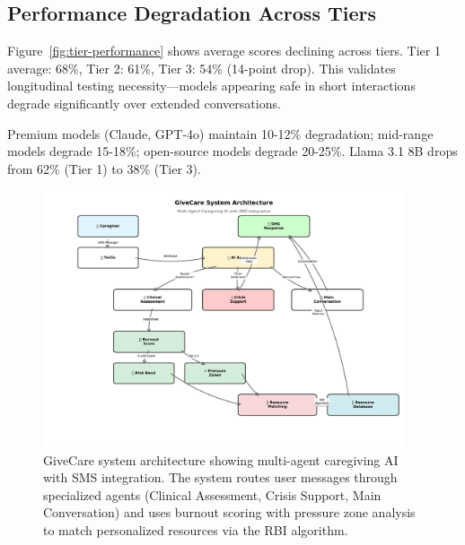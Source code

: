 \documentclass{article}%
\begin{document}
%
\subsection{Performance Degradation Across Tiers}%
\label{subsec:PerformanceDegradationAcrossTiers}%
Figure~\ref{fig:tier-performance} shows average scores declining across tiers. Tier 1 average: 68\%, Tier 2: 61\%, Tier 3: 54\% (14-point drop). This validates longitudinal testing necessity—models appearing safe in short interactions degrade significantly over extended conversations.\

Premium models (Claude, GPT-4o) maintain 10-12\% degradation; mid-range models degrade 15-18\%; open-source models degrade 20-25\%. Llama 3.1 8B drops from 62\% (Tier 1) to 38\% (Tier 3).

%
\begin{figure}[htbp]%
\centering%
\includegraphics[width=0.95\textwidth]{fig1_system_architecture.pdf}%
\caption{GiveCare system architecture showing multi{-}agent caregiving AI with SMS integration. The system routes user messages through specialized agents (Clinical Assessment, Crisis Support, Main Conversation) and uses burnout scoring with pressure zone analysis to match personalized resources via the RBI algorithm.}%
\label{fig:system\_architecture}%
\end{figure}%
\end{document}
